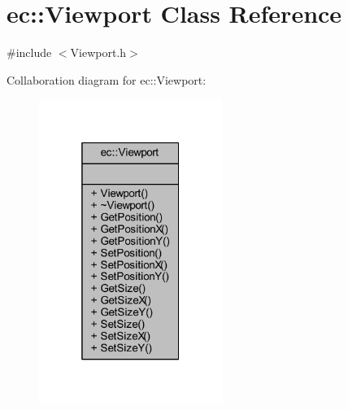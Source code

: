 \hypertarget{classec_1_1_viewport}{}\section{ec\+:\+:Viewport Class Reference}
\label{classec_1_1_viewport}


{\ttfamily \#include $<$Viewport.\+h$>$}



Collaboration diagram for ec\+:\+:Viewport\+:\nopagebreak
\begin{figure}[H]
\begin{center}
\leavevmode
\includegraphics[width=169pt]{classec_1_1_viewport__coll__graph}
\end{center}
\end{figure}
